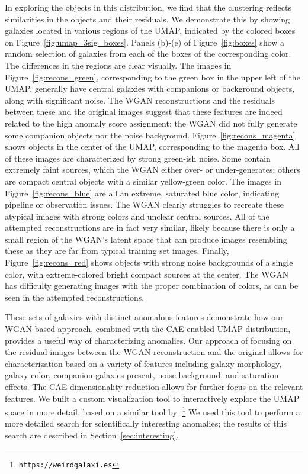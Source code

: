 \documentclass[fleqn,usenatbib,useAMS]{mnras}
\begin{document}
In exploring the objects in this distribution, we find that the clustering reflects similarities in the objects and their residuals.
We demonstrate this by showing galaxies located in various regions of the UMAP, indicated by the colored boxes on Figure~\ref{fig:umap_3sig_boxes}.
Panels (b)-(e) of Figure~\ref{fig:boxes} show a random selection of galaxies from each of the boxes of the corresponding color.
The differences in the regions are clear visually.
The images in Figure~\ref{fig:recons_green}, corresponding to the green box in the upper left of the UMAP, generally have central galaxies with companions or background objects, along with significant noise.
The WGAN reconstructions and the residuals between these and the original images suggest that these features are indeed related to the high anomaly score assignment: the WGAN did not fully generate some companion objects nor the noise background.
Figure~\ref{fig:recons_magenta} shows objects in the center of the UMAP, corresponding to the magenta box.
All of these images are characterized by strong green-ish noise.
Some contain extremely faint sources, which the WGAN either over- or under-generates; others are compact central objects with a similar yellow-green color.
The images in Figure~\ref{fig:recons_blue} are all an extreme, saturated blue color, indicating pipeline or observation issues.
The WGAN clearly struggles to recreate these atypical images with strong colors and unclear central sources.
All of the attempted reconstructions are in fact very similar, likely because there is only a small region of the WGAN's latent space that can produce images resembling these as they are far from typical training set images.
Finally, Figure~\ref{fig:recons_red} shows objects with strong noise backgrounds of a single color, with extreme-colored bright compact sources at the center.
The WGAN has difficulty generating images with the proper combination of colors, as can be seen in the attempted reconstructions.

These sets of galaxies with distinct anomalous features demonstrate how our WGAN-based approach, combined with the CAE-enabled UMAP distribution, provides a useful way of characterizing anomalies.
Our approach of focusing on the residual images between the WGAN reconstruction and the original allows for characterization based on a variety of features including galaxy morphology, galaxy color, companion galaxies present, noise background, and saturation effects.
The CAE dimensionality reduction allows for further focus on the relevant features.
We built a custom visualization tool to interactively explore the UMAP space in more detail, based on a similar tool by \cite{Reis2019}.\footnote{\texttt{https://weirdgalaxi.es}}
We used this tool to perform a more detailed search for scientifically interesting anomalies; the results of this search are described in Section~\ref{sec:interesting}.
\end{document}
